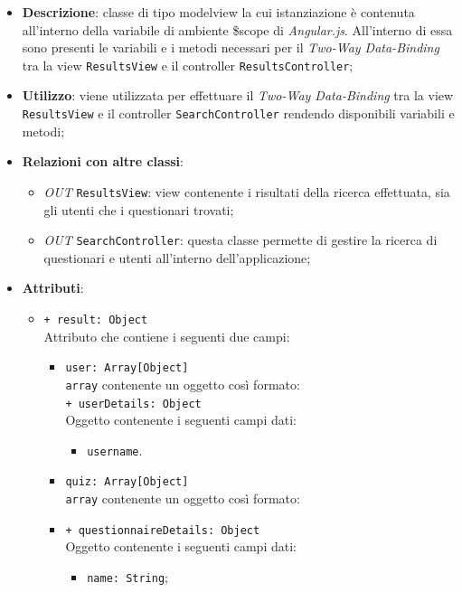 	\begin{itemize}
		\item \textbf{Descrizione}: classe di tipo modelview la cui istanziazione è contenuta all'interno della variabile di ambiente \$scope di \textit{Angular.js}. All'interno di essa sono presenti le variabili e i metodi necessari per il \textit{Two-Way Data-Binding} tra la view \texttt{ResultsView} e il controller \texttt{ResultsController};
		\item \textbf{Utilizzo}: viene utilizzata per effettuare il \textit{Two-Way Data-Binding} tra la view \texttt{ResultsView} e il controller \texttt{SearchController} rendendo disponibili variabili e metodi;
		\item \textbf{Relazioni con altre classi}: 
		\begin{itemize}
			\item \textit{OUT} \texttt{ResultsView}: view contenente i risultati della ricerca effettuata, sia gli utenti che i questionari trovati; 
			\item \textit{OUT} \texttt{SearchController}: questa classe permette di gestire la ricerca di questionari e utenti all’interno dell’applicazione;
		\end{itemize}
		\item \textbf{Attributi}: 
		\begin{itemize}
			\item \texttt{+ result: Object} \\ Attributo che contiene i seguenti due campi: 
			\begin{itemize}
				\item \texttt{user: Array[Object]}\\ \texttt{array} contenente un oggetto così formato:\\
				\texttt{+ userDetails: Object} \\ Oggetto contenente i seguenti campi dati:
				\begin{itemize}
					\item \texttt{username}.
				\end{itemize}
				\item \texttt{quiz: Array[Object]}\\ \texttt{array} contenente un oggetto così formato:\\
				\item \texttt{+ questionnaireDetails: Object} \\ Oggetto contenente i seguenti campi dati:
				\begin{itemize}
					\item \texttt{name: String};

\end{itemize}
\end{itemize}
\end{itemize}
\end{itemize}
